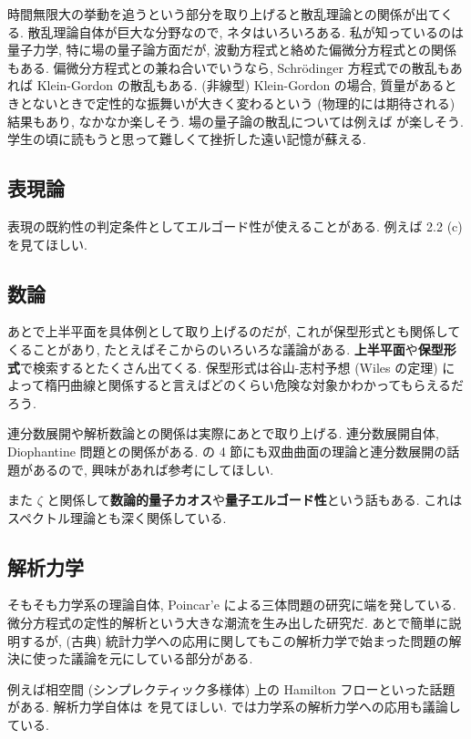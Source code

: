 \documentclass[openany, a4paper, oneside]{jsbook}
\begin{document}
時間無限大の挙動を追うという部分を取り上げると散乱理論との関係が出てくる.
散乱理論自体が巨大な分野なので, ネタはいろいろある.
私が知っているのは量子力学, 特に場の量子論方面だが, 波動方程式と絡めた偏微分方程式との関係もある.
偏微分方程式との兼ね合いでいうなら, Schr\"odinger 方程式での散乱もあれば Klein-Gordon の散乱もある.
(非線型) Klein-Gordon の場合, 質量があるときとないときで定性的な振舞いが大きく変わるという
(物理的には期待される) 結果もあり, なかなか楽しそう.
場の量子論の散乱については例えば \cite{WojciechDybalski1} が楽しそう.
学生の頃に読もうと思って難しくて挫折した遠い記憶が蘇える.
\subsection{表現論}

表現の既約性の判定条件としてエルゴード性が使えることがある.
例えば \cite{KobayashiOshima1} 2.2 (c) を見てほしい.
\subsection{数論}

あとで上半平面を具体例として取り上げるのだが,
これが保型形式とも関係してくることがあり, たとえばそこからのいろいろな議論がある.
\textbf{上半平面}や\textbf{保型形式}で検索するとたくさん出てくる.
保型形式は谷山-志村予想 (Wiles の定理) によって楕円曲線と関係すると言えばどのくらい危険な対象かわかってもらえるだろう.

連分数展開や解析数論との関係は実際にあとで取り上げる.
連分数展開自体, Diophantine 問題との関係がある.
\cite{YasuykiNakamura1} の 4 節にも双曲曲面の理論と連分数展開の話題があるので,
興味があれば参考にしてほしい.

また $\zeta$ と関係して\textbf{数論的量子カオス}や\textbf{量子エルゴード性}という話もある.
これはスペクトル理論とも深く関係している.
\subsection{解析力学}

そもそも力学系の理論自体, Poincar'e による三体問題の研究に端を発している.
微分方程式の定性的解析という大きな潮流を生み出した研究だ.
あとで簡単に説明するが,
(古典) 統計力学への応用に関してもこの解析力学で始まった問題の解決に使った議論を元にしている部分がある.

例えば相空間 (シンプレクティック多様体) 上の Hamilton フローといった話題がある.
解析力学自体は \cite{KenjiFukaya1, NakamuraYamamoto1, NakamuraYamamoto2} を見てほしい.
\cite{NakamuraYamamoto1} では力学系の解析力学への応用も議論している.
\end{document}
